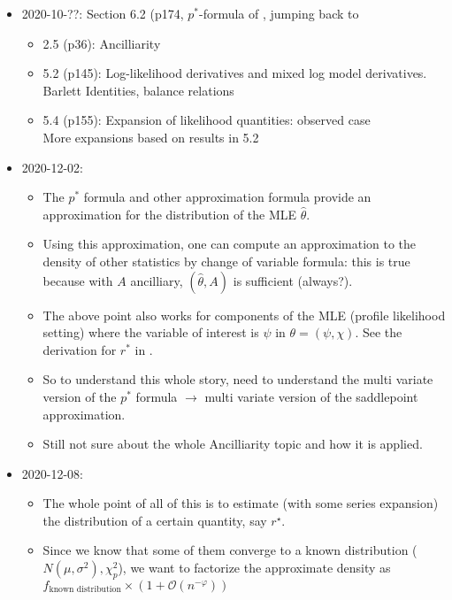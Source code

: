 \begin{itemize}
    \item {
        2020-10-??: Section 6.2 (p174, $p^*$-formula of \cite{BarndorffNielsen1994}, jumping back to 
        \begin{itemize}
            \item 2.5 (p36): Ancilliarity
            \item {5.2 (p145): Log-likelihood derivatives and mixed log model derivatives.\\
                Barlett Identities, balance relations
            }
            \item 5.4 (p155): {Expansion of likelihood quantities: observed case\\
                More expansions based on results in 5.2
            }
        \end{itemize}
    }
    \item {
        2020-12-02:
        \begin{itemize}
            \item The $p^*$ formula and other approximation formula provide an approximation for the distribution of the MLE $\hat\theta$.
            \item Using this approximation, one can compute an approximation to the density of other statistics by change of variable formula: this is true because with $A$ ancilliary, $(\hat\theta, A)$ is sufficient (always?).
            \item The above point also works for components of the MLE (profile likelihood setting) where the variable of interest is $\psi$ in $\theta = (\psi, \chi)$. See the derivation for $r^*$ in \cite[Section 6.6.1]{BarndorffNielsen1994}.
            \item So to understand this whole story, need to understand the multi variate version of the $p^*$ formula $\rightarrow$ multi variate version of the saddlepoint approximation.
            \item Still not sure about the whole Ancilliarity topic and how it is applied.
        \end{itemize}
    }
    \item{
        2020-12-08:
        \begin{itemize}
            \item The whole point of all of this is to estimate (with some series expansion) the distribution of a certain quantity, say $r^\star$.
            \item Since we know that some of them converge to a known distribution ($N(\mu, \sigma^2) ,\chi^2_p$), we want to factorize the approximate density as $f_{\text{known distribution}} \times (1 + \mathcal{O}(n^{-\varphi}))$
        \end{itemize}
    }
\end{itemize}


